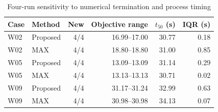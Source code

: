 \begin{table}[!t]
\centering\caption{Four-run sensitivity to numerical termination and process timing}
\label{tab:repeat}
\footnotesize\begin{tabular}{llrrrr}
\toprule
Case & Method & New & Objective range & $t_{50}$ (s) & IQR (s)\\
\midrule
W02 & Proposed & 4/4 & 16.99--17.00 & 30.77 & 0.18\\
W02 & MAX & 4/4 & 18.80--18.80 & 31.00 & 0.85\\
W05 & Proposed & 4/4 & 13.09--13.09 & 31.14 & 0.29\\
W05 & MAX & 4/4 & 13.13--13.13 & 30.71 & 0.02\\
W09 & Proposed & 4/4 & 31.17--31.24 & 32.99 & 0.63\\
W09 & MAX & 4/4 & 30.98--30.98 & 34.13 & 0.07\\
\bottomrule\end{tabular}
\end{table}
